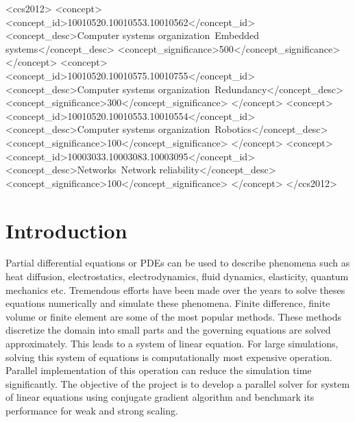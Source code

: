 \documentclass[sigplan,screen]{acmart}
\begin{document}
\begin{CCSXML}
	<ccs2012>
	<concept>
	<concept_id>10010520.10010553.10010562</concept_id>
	<concept_desc>Computer systems organization~Embedded systems</concept_desc>
	<concept_significance>500</concept_significance>
	</concept>
	<concept>
	<concept_id>10010520.10010575.10010755</concept_id>
	<concept_desc>Computer systems organization~Redundancy</concept_desc>
	<concept_significance>300</concept_significance>
	</concept>
	<concept>
	<concept_id>10010520.10010553.10010554</concept_id>
	<concept_desc>Computer systems organization~Robotics</concept_desc>
	<concept_significance>100</concept_significance>
	</concept>
	<concept>
	<concept_id>10003033.10003083.10003095</concept_id>
	<concept_desc>Networks~Network reliability</concept_desc>
	<concept_significance>100</concept_significance>
	</concept>
	</ccs2012>
\end{CCSXML}





\maketitle

\section{Introduction}
Partial differential equations or PDEs can be used to describe phenomena such as heat diffusion, electrostatics, electrodynamics, fluid dynamics, elasticity, quantum mechanics etc. Tremendous efforts have been made over the years to solve theses equations numerically and simulate these phenomena. Finite difference, finite volume or finite element are some of the most popular methods. These methods discretize the domain into small parts and the governing equations are solved approximately. This leads to a system of linear equation. For large simulations, solving this system of equations is computationally most expensive operation. Parallel implementation of this operation can reduce the simulation time significantly. The objective of the project is to develop a parallel solver for system of linear equations using conjugate gradient algorithm and benchmark its performance for weak and strong scaling.
\end{document}
